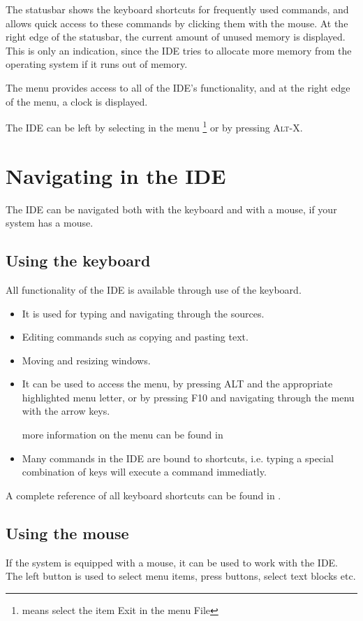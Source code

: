 The statusbar shows the keyboard shortcuts for frequently used 
commands, and allows quick access to these commands by clicking 
them with the mouse. 
At the right edge of the statusbar, the current amount of unused 
memory is displayed. This is only an indication, since the IDE 
tries to allocate more memory from the operating system if it 
runs out of memory.

The menu provides access to all of the IDE's functionality, and
at the right edge of the menu, a clock is displayed.

The IDE can be left by selecting  in the menu
\footnote{ means select the item Exit in the menu File}
or by pressing \textsc{Alt-X}.

\section{Navigating in the IDE}
The IDE can be navigated both with the keyboard and with a mouse, if your
system has a mouse.

\subsection{Using the keyboard} 
All functionality of the IDE is available through use of the keyboard.
\begin{itemize}
\item It is used for typing and navigating through the sources.
\item Editing commands such as copying and pasting text.
\item Moving and resizing windows.
\item It can be used to access the menu, by pressing \textsc{ALT} and the
appropriate highlighted menu letter, or by pressing \textsc{F10} and
navigating through the menu with the arrow keys.

more information on the menu can be found in 
\item Many commands in the IDE are bound to shortcuts, i.e. typing a special
combination of keys will execute a command immediatly.
\end{itemize}
\begin{remark}
A complete reference of all keyboard shortcuts can be found in
.
\end{remark}

\subsection{Using the mouse}
\label{suse:mouseusage}
If the system is equipped with a mouse, it can be used to work with the
IDE. The left button is used to select menu items, press buttons, select
text blocks etc. 

